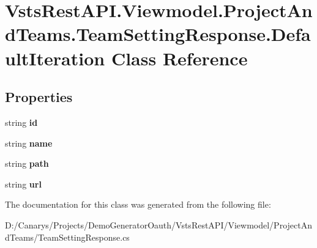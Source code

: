 \hypertarget{class_vsts_rest_a_p_i_1_1_viewmodel_1_1_project_and_teams_1_1_team_setting_response_1_1_default_iteration}{}\section{Vsts\+Rest\+A\+P\+I.\+Viewmodel.\+Project\+And\+Teams.\+Team\+Setting\+Response.\+Default\+Iteration Class Reference}
\label{class_vsts_rest_a_p_i_1_1_viewmodel_1_1_project_and_teams_1_1_team_setting_response_1_1_default_iteration}
\subsection*{Properties}
\begin{DoxyCompactItemize}
\item 
\mbox{\label{class_vsts_rest_a_p_i_1_1_viewmodel_1_1_project_and_teams_1_1_team_setting_response_1_1_default_iteration_a3e7c1306aed82e9353d91c0496f6dac2}} 
string {\bfseries id}
\item 
\mbox{\label{class_vsts_rest_a_p_i_1_1_viewmodel_1_1_project_and_teams_1_1_team_setting_response_1_1_default_iteration_a0755ad31b0d1a96b694e0b72e4269d43}} 
string {\bfseries name}
\item 
\mbox{\label{class_vsts_rest_a_p_i_1_1_viewmodel_1_1_project_and_teams_1_1_team_setting_response_1_1_default_iteration_a8227a2e1bf8e062a6edeaf270cedcc18}} 
string {\bfseries path}
\item 
\mbox{\label{class_vsts_rest_a_p_i_1_1_viewmodel_1_1_project_and_teams_1_1_team_setting_response_1_1_default_iteration_a8b7a799a6121732ac6135301074857cd}} 
string {\bfseries url}
\end{DoxyCompactItemize}


The documentation for this class was generated from the following file\+:\begin{DoxyCompactItemize}
\item 
D\+:/\+Canarys/\+Projects/\+Demo\+Generator\+Oauth/\+Vsts\+Rest\+A\+P\+I/\+Viewmodel/\+Project\+And\+Teams/Team\+Setting\+Response.\+cs\end{DoxyCompactItemize}
